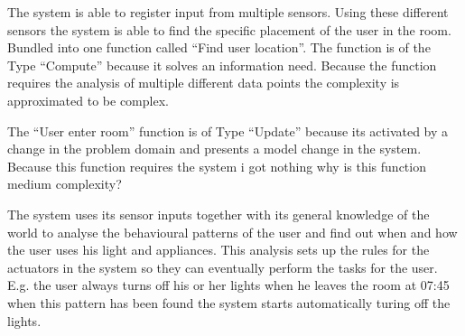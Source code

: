 The system is able to register input from multiple sensors. Using these different sensors the system is able to find the specific placement of the user in the room. Bundled into one function called \enquote{Find user location}. The function is of the Type \enquote{Compute} because it solves an information need. Because the function requires the analysis of multiple different data points the complexity is approximated to be complex.

The \enquote{User enter room} function is of Type \enquote{Update} because its activated by a change in the problem domain and presents a model change in the system. Because this function requires the system i got nothing why is this function medium complexity?

The system uses its sensor inputs together with its general knowledge of the world to analyse the behavioural patterns of the user and find out when and how the user uses his light and appliances. This analysis sets up the rules for the actuators in the system so they can eventually perform the tasks for the user. E.g. the user always turns off his or her lights when he leaves the room at 07:45 when this pattern has been found the system starts automatically turing off the lights.
